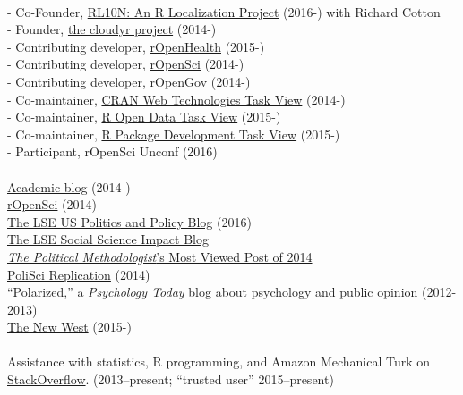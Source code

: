\documentclass[12pt]{article}
\renewcommand{\section}[1]{\pagebreak[3]%
    \llap{\scshape\smash{\parbox[t]{\marginparwidth}{\raggedright {\color{lg}#1}}}}%
    \vspace{-\baselineskip}\par}
\newcommand{\topic}[1]{\pagebreak[3]\indent {\color{lg}{\footnotesize #1 }}\\}
\newcommand{\entry}[1]{\indent {\color{lg}\guillemotright}\hspace{2pt}#1\vspace{.25em}\\}
\newcommand{\subentry}[1]{{\color{lg}-} #1\vspace{.25em}\\}
\begin{document}
\section{Public\\ Engagement}
	\topic{Open Science Evangelism}
		\subentry{Co-Founder, \href{http://rl10n.github.io/}{RL10N: An R Localization Project} (2016-) with Richard Cotton}
		\subentry{Founder, \href{http://cloudyr.github.io/}{the cloudyr project} (2014-)}
		\subentry{Contributing developer, \href{http://ropensci.org/}{rOpenHealth} (2015-)}
		\subentry{Contributing developer, \href{http://ropensci.org/}{rOpenSci} (2014-)}
		\subentry{Contributing developer, \href{http://ropengov.github.io/}{rOpenGov} (2014-)}
		\subentry{Co-maintainer, \href{http://cran.r-project.org/web/views/WebTechnologies.html}{CRAN Web Technologies Task View} (2014-)}
		\subentry{Co-maintainer, \href{https://www.github.com/ropensci/opendata}{R Open Data Task View} (2015-)}
		\subentry{Co-maintainer, \href{https://www.github.com/leeper/PackageDevelopment}{R Package Development Task View} (2015-)}
		\subentry{Participant, rOpenSci Unconf (2016)}
	\topic{Occasional Blogging}
		\entry{\href{http://thomasleeper.com/blog}{Academic blog} (2014-)}
		\entry{\href{http://ropensci.org/blog/}{rOpenSci} (2014)}
		\entry{\href{http://blogs.lse.ac.uk/usappblog/2016/09/23/for-voters-the-2016-election-campaign-is-a-marathon-with-very-limited-choices/}{The LSE US Politics and Policy Blog} (2016)}
		\entry{\href{http://blogs.lse.ac.uk/impactofsocialsciences/2016/05/18/elsevier-purchase-ssrn-social-scientists-face-questions-over-whether-centralised-repository-is-in-their-interests/}{The LSE Social Science Impact Blog}}
		\entry{\href{http://thepoliticalmethodologist.com/2015/01/05/introducing-the-annual-tpm-most-viewed-post-award-and-our-2014-winner/}{\textit{The Political Methodologist}'s Most Viewed Post of 2014}}
		\entry{\href{http://politicalsciencereplication.wordpress.com/}{PoliSci Replication} (2014)}
		\entry{``\href{http://www.psychologytoday.com/blog/polarized}{Polarized},'' a \textit{Psychology Today} blog about psychology and public opinion (2012-2013)}
		\entry{\href{https://thewpsa.wordpress.com/2015/05/09/what-can-we-learn-from-10-1-million-facebook-users-its-complicated/}{The New West} (2015-)}
	\topic{Miscellaneous}
		\entry{Assistance with statistics, R programming, and Amazon Mechanical Turk on \href{http://stackoverflow.com/users/2338862/thomas}{StackOverflow}. (2013--present; ``trusted user'' 2015--present)}
\end{document}
